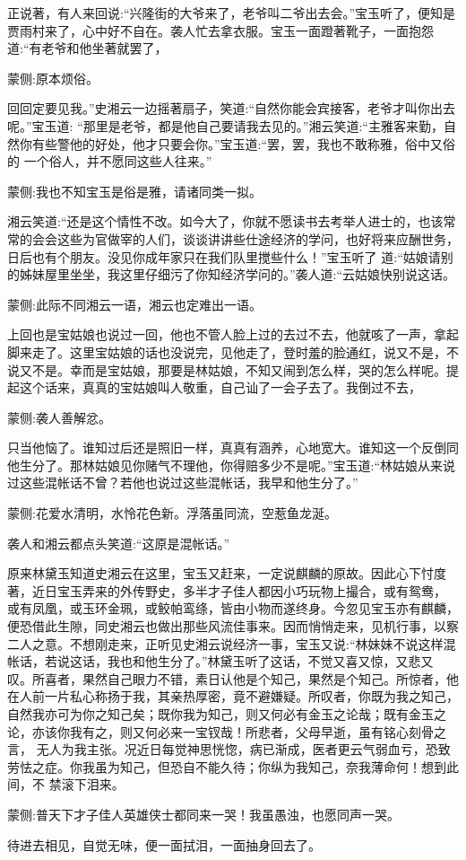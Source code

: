 \begin{parag}
    正说著，有人来回说:“兴隆街的大爷来了，老爷叫二爷出去会。”宝玉听了，便知是贾雨村来了，心中好不自在。袭人忙去拿衣服。宝玉一面蹬著靴子，一面抱怨道:“有老爷和他坐著就罢了，\begin{note}蒙侧:原本烦俗。\end{note}回回定要见我。”史湘云一边摇著扇子，笑道:“自然你能会宾接客，老爷才叫你出去呢。”宝玉道: “那里是老爷，都是他自己要请我去见的。”湘云笑道:“主雅客来勤，自然你有些警他的好处，他才只要会你。”宝玉道:“罢，罢，我也不敢称雅，俗中又俗的 一个俗人，并不愿同这些人往来。”\begin{note}蒙侧:我也不知宝玉是俗是雅，请诸同类一拟。\end{note}湘云笑道:“还是这个情性不改。如今大了，你就不愿读书去考举人进士的，也该常常的会会这些为官做宰的人们，谈谈讲讲些仕途经济的学问，也好将来应酬世务，日后也有个朋友。没见你成年家只在我们队里搅些什么！”宝玉听了 道:“姑娘请别的姊妹屋里坐坐，我这里仔细污了你知经济学问的。”袭人道:“云姑娘快别说这话。\begin{note}蒙侧:此际不同湘云一语，湘云也定难出一语。\end{note}上回也是宝姑娘也说过一回，他也不管人脸上过的去过不去，他就咳了一声，拿起脚来走了。这里宝姑娘的话也没说完，见他走了，登时羞的脸通红，说又不是，不说又不是。幸而是宝姑娘，那要是林姑娘，不知又闹到怎么样，哭的怎么样呢。提起这个话来，真真的宝姑娘叫人敬重，自己讪了一会子去了。我倒过不去，\begin{note}蒙侧:袭人善解忿。\end{note}只当他恼了。谁知过后还是照旧一样，真真有涵养，心地宽大。谁知这一个反倒同他生分了。那林姑娘见你赌气不理他，你得赔多少不是呢。”宝玉道:“林姑娘从来说过这些混帐话不曾？若他也说过这些混帐话，我早和他生分了。”\begin{note}蒙侧:花爱水清明，水怜花色新。浮落虽同流，空惹鱼龙涎。\end{note}袭人和湘云都点头笑道:“这原是混帐话。”
\end{parag}


\begin{parag}
    原来林黛玉知道史湘云在这里，宝玉又赶来，一定说麒麟的原故。因此心下忖度著，近日宝玉弄来的外传野史，多半才子佳人都因小巧玩物上撮合，或有鸳鸯， 或有凤凰，或玉环金珮，或鲛帕鸾绦，皆由小物而遂终身。今忽见宝玉亦有麒麟，便恐借此生隙，同史湘云也做出那些风流佳事来。因而悄悄走来，见机行事，以察二人之意。不想刚走来，正听见史湘云说经济一事，宝玉又说:“林妹妹不说这样混帐话，若说这话，我也和他生分了。”林黛玉听了这话，不觉又喜又惊，又悲又 叹。所喜者，果然自己眼力不错，素日认他是个知己，果然是个知己。所惊者，他在人前一片私心称扬于我，其亲热厚密，竟不避嫌疑。所叹者，你既为我之知己， 自然我亦可为你之知己矣；既你我为知己，则又何必有金玉之论哉；既有金玉之论，亦该你我有之，则又何必来一宝钗哉！所悲者，父母早逝，虽有铭心刻骨之言， 无人为我主张。况近日每觉神思恍惚，病已渐成，医者更云气弱血亏，恐致劳怯之症。你我虽为知己，但恐自不能久待；你纵为我知己，奈我薄命何！想到此间，不 禁滚下泪来。\begin{note}蒙侧:普天下才子佳人英雄侠士都同来一哭！我虽愚浊，也愿同声一哭。\end{note}待进去相见，自觉无味，便一面拭泪，一面抽身回去了。
\end{parag}


